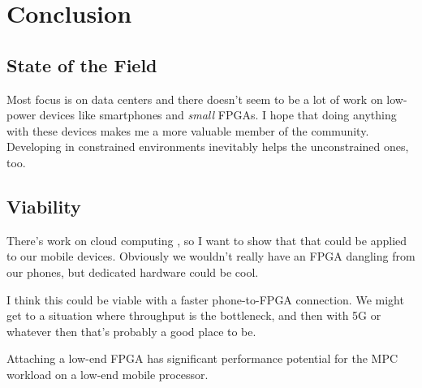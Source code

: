 \section{Conclusion}
\subsection{State of the Field}
Most focus is on data centers and there doesn't seem to be a lot of work on low-power devices like smartphones and \textit{small} FPGAs. I hope that doing anything with these devices makes me a more valuable member of the community. Developing in constrained environments inevitably helps the unconstrained ones, too.

\subsection{Viability}
There's work on cloud computing , so I want to show that that could be applied to our mobile devices. Obviously we wouldn't really have an FPGA dangling from our phones, but dedicated hardware could be cool. 

I think this could be viable with a faster phone-to-FPGA connection. We might get to a situation where throughput is the bottleneck, and then with 5G or whatever then that's probably a good place to be.

Attaching a low-end FPGA has significant performance potential for the MPC workload on a low-end mobile processor. 
